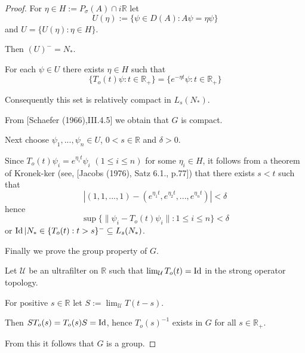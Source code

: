 \begin{proof}
For $\eta \in H := P_{\sigma}(A) \cap i\mathbb{R}$ let
\[
U(\eta) := \{\psi \in D(A): A\psi = \eta\psi\}
\]
and $U = \{U(\eta) : \eta \in H\}$.

Then $(U)^{-} = N_{*}$.

For each $\psi \in U$ there exists $\eta \in H$ such that
\[
\{T_{o}(t)\psi : t \in \mathbb{R}_{+}\} = \{e^{-\eta t}\psi : t \in \mathbb{R}_{+}\}
\]

Consequently this set is relatively compact in $L_{s}(N_{*})$.

From [Schaefer (1966),III.4.5] we obtain that $G$ is compact.

Next choose $\psi_{1}, ..., \psi_{n} \in U$, $0 < s \in \mathbb{R}$ and $\delta > 0$.

Since $T_{o}(t)\psi_{i} = e^{\eta_{i}t}\psi_{i}$ $(1 \leq i \leq n)$ for some $\eta_{i} \in H$, it follows from a theorem of Kronek-ker (see, [Jacobs (1976), Satz 6.1., p.77]) that there exists $s < t$ such that
\[
|(1,1, ..., 1) - (e^{\eta_{1}t}, e^{\eta_{2}t}, ..., e^{\eta_{n}t})| < \delta
\]
hence
\[
\sup\{\|\psi_{i} - T_{o}(t)\psi_{i}\| : 1 \leq i \leq n\} < \delta
\]
or $\operatorname{Id}|N_{*} \in \{T_{o}(t) : t>s\}^{-} \subseteq L_{s}(N_{*})$.






Finally we prove the group property of $G$.

Let $\mathcal{U}$ be an ultrafilter on $\mathbb{R}$ such that $\lim_{\mathcal{U}}T_{o}(t) = \operatorname{Id}$ in the strong operator topology.

For positive $s \in \mathbb{R}$ let $S := \lim_{\mathcal{U}}T(t-s)$.

Then $ST_{o}(s) = T_{o}(s)S = \operatorname{Id}$, hence $T_{o}(s)^{-1}$ exists in $G$ for all $s \in \mathbb{R}_{+}$.

From this it follows that $G$ is a group.
\end{proof}

